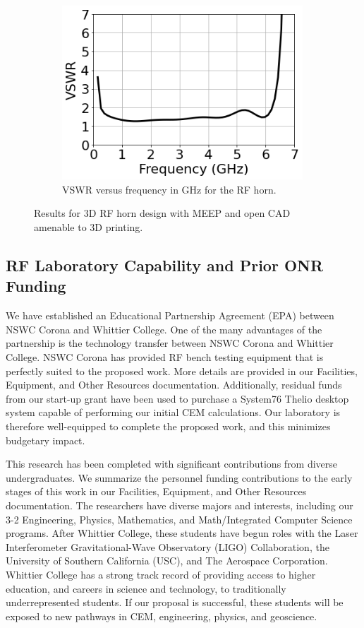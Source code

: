 \documentclass[11pt]{amsart}
\begin{document}
\begin{figure}[ht]
\begin{subfigure}{0.65\textwidth}
\end{subfigure}
\hfill
\begin{subfigure}{0.3\textwidth}
    \includegraphics[width=0.99\textwidth]{figures/vswr.png}
	\caption{VSWR versus frequency in GHz for the RF horn.}
\end{subfigure}
\caption{Results for 3D RF horn design with MEEP and open CAD amenable to 3D printing.}
\label{fig:3d_cad}
\end{figure}

\subsection{RF Laboratory Capability and Prior ONR Funding}

We have established an Educational Partnership Agreement (EPA) between NSWC Corona and Whittier College.  One of the many advantages of the partnership is the technology transfer between NSWC Corona and Whittier College.  NSWC Corona has provided RF bench testing equipment that is perfectly suited to the proposed work.  More details are provided in our Facilities, Equipment, and Other Resources documentation.  Additionally, residual funds from our start-up grant have been used to purchase a System76 Thelio desktop system capable of performing our initial CEM calculations.  Our laboratory is therefore well-equipped to complete the proposed work, and this minimizes budgetary impact.  

This research has been completed with significant contributions from diverse undergraduates.  We summarize the personnel funding contributions to the early stages of this work in our Facilities, Equipment, and Other Resources documentation.  The researchers have diverse majors and interests, including our 3-2 Engineering, Physics, Mathematics, and Math/Integrated Computer Science programs.   After Whittier College, these students have begun roles with the Laser Interferometer Gravitational-Wave Observatory (LIGO) Collaboration, the University of Southern California (USC), and The Aerospace Corporation.  Whittier College has a strong track record of providing access to higher education, and careers in science and technology, to traditionally underrepresented students.  If our proposal is successful, these students will be exposed to new pathways in CEM, engineering, physics, and geoscience.
\end{document}
